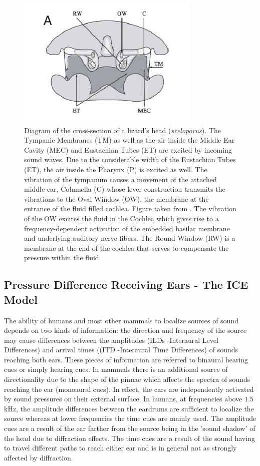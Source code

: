 \begin{figure}[ht]
 \centering
 \includegraphics[width=0.45\linewidth]{Diagrams/lizardheadcrosssection.jpeg}
 \caption[Cross Section of a Lizards Head]{Diagram of the cross-section of a lizard’s head (\emph{sceloporus}). The Tympanic Membranes (TM) as well as
 the air inside the Middle Ear Cavity (MEC) and Eustachian Tubes (ET) are excited by incoming sound waves. Due to the considerable width of the Eustachian Tubes (ET), the air inside the Pharynx (P) is excited as well.
 The vibration of the tympanum causes a movement of the attached middle ear, Columella (C) whose lever construction transmits the vibrations to the Oval Window (OW), the membrane at the entrance of the fluid filled cochlea.
 Figure taken from \cite{dalsgaardmanley1}. The vibration of the OW excites the fluid in the Cochlea which gives rise to a frequency-dependent activation of the embedded basilar membrane and underlying
 auditory nerve fibers. The Round Window (RW) is a membrane at the end of the cochlea that serves to compensate the pressure within the fluid.}
 \label{lizardheadcrosssection}
\end{figure}

\subsection{Pressure Difference Receiving Ears - The ICE Model}\label{iceintrosection}
The ability of humans and most other mammals to localize sources of sound depends on two kinds of information: the direction and frequency
of the source may cause differences between the amplitudes (ILDs -Interaural Level Differences) and arrival times ((ITD -Interaural Time Differences) of sounds reaching both ears. These pieces of information are
referred to binaural hearing cues or simply hearing cues. In mammals there is an additional source of directionality due to the shape
of the pinnae which affects the spectra of sounds reaching the ear (monoaural cues). In effect, the ears are independently activated by sound pressures
on their external surface. In humans, at frequencies above $1.5$kHz, the amplitude differences between the eardrums are sufficient
to localize the source whereas at lower frequencies the time cues are mainly used. The amplitude cues are a result of the ear farther
from the source being in the 'sound shadow' of the head due to diffraction effects. The time cues are a result of the sound having to travel
different paths to reach either ear and is in general not as strongly affected by diffraction.

